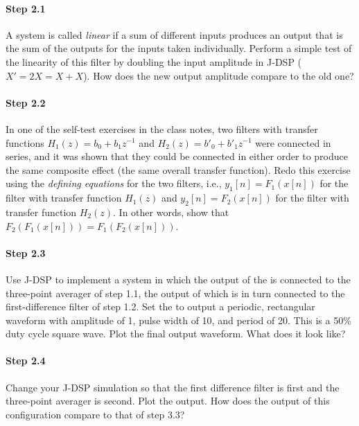 \paragraph{Step 2.1} A system is called \emph{linear} if a sum of
different inputs produces an output that is the sum of the outputs for
the inputs taken individually.  Perform a simple test of the linearity
of this filter by doubling the input amplitude in J-DSP ($X' = 2X = X
+ X$). How does the new output amplitude compare to the old one?


\paragraph{Step 2.2} In one of the self-test exercises in the class notes,
	two filters with transfer functions $H_1(z) = b_0 + b_1z^{-1}$ and
	$H_2(z) = b'_0 + b'_1z^{-1}$ were connected in series, and it was
	shown that they could be connected in either order to produce the same
	composite effect (the same overall transfer function). Redo this
	exercise using the \emph{defining equations} for the two filters, i.e.,
	$y_1[n] = F_1(x[n])$ for the filter with transfer function $H_1(z)$
	and $y_2[n] = F_2(x[n])$ for the filter with transfer function
	$H_2(z)$. In other words, show that $F_2(F_1(x[n])) =
	F_1(F_2(x[n]))$.


\paragraph{Step 2.3} Use J-DSP to implement a system in which the output of
	the  is connected to the three-point averager of step
	1.1, the output of which is in turn connected to the first-difference
	filter of step 1.2. Set the  to output a periodic,
	rectangular waveform with amplitude of 1, pulse width of 10, and
	period of 20. This is a 50\% duty cycle square wave. Plot the final
	output waveform. What does it look like?


\paragraph{Step 2.4} Change your J-DSP simulation so that the first
	difference filter is first and the three-point averager is
	second. Plot the output. How does the output of this configuration
	compare to that of step 3.3?


